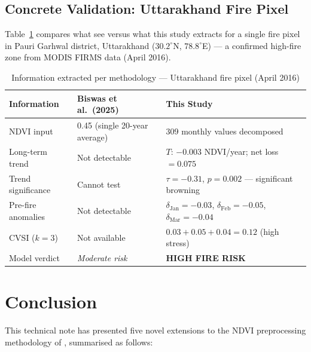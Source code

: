 \documentclass[12pt, a4paper]{article}
\begin{document}
\subsection{Concrete Validation: Uttarakhand Fire Pixel}

Table~\ref{tab:example} compares what \citet{biswas2025} see versus
what this study extracts for a single fire pixel in Pauri Garhwal
district, Uttarakhand ($30.2^{\circ}$N, $78.8^{\circ}$E) ---
a confirmed high-fire zone from MODIS FIRMS data (April 2016).

\begin{table}[H]
\centering
\caption{Information extracted per methodology ---
         Uttarakhand fire pixel (April 2016)}
\label{tab:example}
\small
\begin{tabular}{@{}lll@{}}
\toprule
\textbf{Information} &
\textbf{Biswas et al.\ (2025)} &
\textbf{This Study} \\
\midrule
NDVI input &
  0.45 (single 20-year average) &
  309 monthly values decomposed \\
Long-term trend &
  Not detectable &
  $T$: $-0.003$ NDVI/year; net loss $= 0.075$ \\
Trend significance &
  Cannot test &
  $\tau = -0.31$, $p = 0.002$ --- significant browning \\
Pre-fire anomalies &
  Not detectable &
  $\delta_{\text{Jan}}=-0.03$, $\delta_{\text{Feb}}=-0.05$,
  $\delta_{\text{Mar}}=-0.04$ \\
CVSI ($k=3$) &
  Not available &
  $0.03 + 0.05 + 0.04 = 0.12$ (high stress) \\
\midrule
Model verdict &
  \textit{Moderate risk} &
  \textbf{HIGH FIRE RISK} \\
\bottomrule
\end{tabular}
\end{table}

\section{Conclusion}
\label{sec:conclusion}

This technical note has presented five novel extensions to the NDVI
preprocessing methodology of \citet{biswas2025}, summarised as follows:
\end{document}
